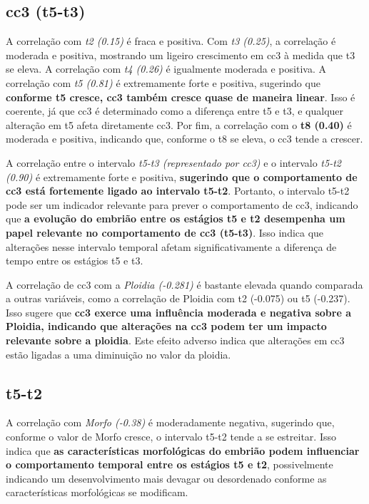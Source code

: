 \subsection*{cc3 (t5-t3)}
A correlação com \textit{t2 (0.15)} é fraca e positiva. Com \textit{t3 (0.25)}, a correlação é moderada e positiva, mostrando um ligeiro crescimento em cc3 à medida que t3 se eleva. A correlação com \textit{t4 (0.26)} é igualmente moderada e positiva. A correlação com \textit{t5 (0.81)} é extremamente forte e positiva, sugerindo que \textbf{conforme t5 cresce, cc3 também cresce quase de maneira linear}. Isso é coerente, já que cc3 é determinado como a diferença entre t5 e t3, e qualquer alteração em t5 afeta diretamente cc3. Por fim, a correlação com o \textbf{t8 (0.40)} é moderada e positiva, indicando que, conforme o t8 se eleva, o cc3 tende a crescer.

A correlação entre o intervalo \textit{t5-t3 (representado por cc3)} e o intervalo \textit{t5-t2 (0.90)} é extremamente forte e positiva, \textbf{sugerindo que o comportamento de cc3 está fortemente ligado ao intervalo t5-t2}. Portanto, o intervalo t5-t2 pode ser um indicador relevante para prever o comportamento de cc3, indicando que \textbf{a evolução do embrião entre os estágios t5 e t2 desempenha um papel relevante no comportamento de cc3 (t5-t3)}. Isso indica que alterações nesse intervalo temporal afetam significativamente a diferença de tempo entre os estágios t5 e t3. 

A correlação de cc3 com a \textit{Ploidia (-0.281)} é bastante elevada quando comparada a outras variáveis, como a correlação de Ploidia com t2 (-0.075) ou t5 (-0.237). Isso sugere que \textbf{cc3 exerce uma influência moderada e negativa sobre a Ploidia, indicando que alterações na cc3 podem ter um impacto relevante sobre a ploidia}. Este efeito adverso indica que alterações em cc3 estão ligadas a uma diminuição no valor da ploidia.

\subsection*{t5-t2}
A correlação com \textit{Morfo (-0.38)} é moderadamente negativa, sugerindo que, conforme o valor de Morfo cresce, o intervalo t5-t2 tende a se estreitar. Isso indica que \textbf{as características morfológicas do embrião podem influenciar o comportamento temporal entre os estágios t5 e t2}, possivelmente indicando um desenvolvimento mais devagar ou desordenado conforme as características morfológicas se modificam.

